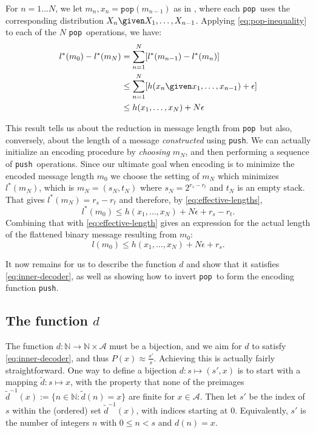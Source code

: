 \documentclass{article}
\theoremstyle{definition}
\newcommand{\push}{\texttt{push}}
\newcommand{\pop}{\texttt{pop}}
\begin{document}
  For \(n=1\ldots N\), we let \(m_n, x_n = \pop(m_{n-1})\) as in
  , where each \pop\ uses the corresponding distribution
  \(X_n \given X_1, \ldots, X_{n-1}\). Applying \cref{eq:pop-inequality} to
  each of the \(N\) \pop\ operations, we have:
  \begin{align}
    l^*(m_0) - l^*(m_N)
      &= \sum_{n=1}^N [l^*(m_{n-1}) - l^*(m_n)]\\
      &\leq \sum_{n=1}^N [h(x_n \given x_1, \ldots, x_{n-1}) + \epsilon]\\
      &\leq h(x_1, \ldots, x_N) + N\epsilon\label{eq:effective-lengths}
  \end{align}

  This result tells us about the reduction in message length from \pop\, but
  also, conversely, about the length of a message \emph{constructed} using
  \push. We can actually initialize an encoding procedure by \emph{choosing}
  \(m_N\), and then performing a sequence of \push\ operations. Since our
  ultimate goal when encoding is to minimize the encoded message length \(m_0\)
  we choose the setting of \(m_N\) which minimizes \(l^*(m_N)\), which is \(m_N
  = (s_N, t_N)\) where \(s_N = 2^{r_s - r_t}\) and \(t_N\) is an empty stack.
  That gives \(l^*(m_N) = r_s - r_t\) and therefore, by
  \cref{eq:effective-lengths},
  \begin{equation}
    l^*(m_0) \leq h(x_1, \ldots, x_N) + N\epsilon + r_s - r_t.
  \end{equation}
  Combining that with \cref{eq:effective-length} gives an expression for the
  actual length of the flattened binary message resulting from \(m_0\):
  \begin{equation}
    l(m_0) \leq h(x_1, \ldots, x_N) + N\epsilon + r_s.
  \end{equation}

  It now remains for us to describe the function \(d\) and show that it
  satisfies \cref{eq:inner-decoder}, as well as showing how to invert \pop\ to
  form the encoding function \push.


\subsection{The function \(d\)}
The function \(d:\mathbb{N}\rightarrow\mathbb{N}\times\mathcal{A}\) must be a
bijection, and we aim for \(d\) to satisfy \cref{eq:inner-decoder}, and thus
\(P(x)\approx \frac{s'}{s}\).  Achieving this is actually fairly
straightforward.  One way to define a bijection \(d:s\mapsto(s', x)\) is to
start with a mapping \(\tilde d: s\mapsto x\), with the property that none of
the preimages \(\tilde d^{-1}(x):=\{n\in\mathbb{N}:\tilde d(n) = x\}\) are
finite for \(x\in\mathcal{A}\). Then let \(s'\) be the index of \(s\) within
the (ordered) set \(\tilde d^{-1}(x)\), with indices starting at \(0\).
Equivalently, \(s'\) is the number of integers \(n\) with \(0\leq n<s\) and
\(d(n) = x\).
\end{document}
